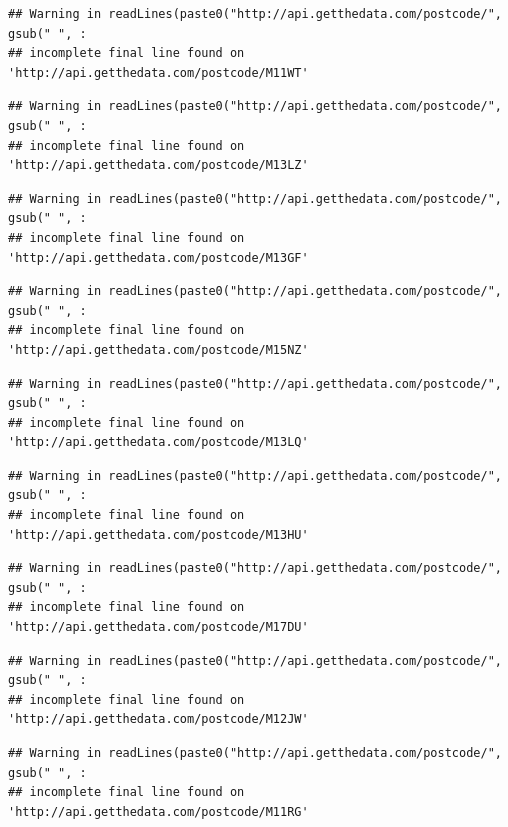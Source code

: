 \documentclass[]{book}
\begin{document}
\begin{verbatim}
## Warning in readLines(paste0("http://api.getthedata.com/postcode/", gsub(" ", :
## incomplete final line found on 'http://api.getthedata.com/postcode/M11WT'
\end{verbatim}

\begin{verbatim}
## Warning in readLines(paste0("http://api.getthedata.com/postcode/", gsub(" ", :
## incomplete final line found on 'http://api.getthedata.com/postcode/M13LZ'
\end{verbatim}

\begin{verbatim}
## Warning in readLines(paste0("http://api.getthedata.com/postcode/", gsub(" ", :
## incomplete final line found on 'http://api.getthedata.com/postcode/M13GF'
\end{verbatim}

\begin{verbatim}
## Warning in readLines(paste0("http://api.getthedata.com/postcode/", gsub(" ", :
## incomplete final line found on 'http://api.getthedata.com/postcode/M15NZ'
\end{verbatim}

\begin{verbatim}
## Warning in readLines(paste0("http://api.getthedata.com/postcode/", gsub(" ", :
## incomplete final line found on 'http://api.getthedata.com/postcode/M13LQ'
\end{verbatim}

\begin{verbatim}
## Warning in readLines(paste0("http://api.getthedata.com/postcode/", gsub(" ", :
## incomplete final line found on 'http://api.getthedata.com/postcode/M13HU'
\end{verbatim}

\begin{verbatim}
## Warning in readLines(paste0("http://api.getthedata.com/postcode/", gsub(" ", :
## incomplete final line found on 'http://api.getthedata.com/postcode/M17DU'
\end{verbatim}

\begin{verbatim}
## Warning in readLines(paste0("http://api.getthedata.com/postcode/", gsub(" ", :
## incomplete final line found on 'http://api.getthedata.com/postcode/M12JW'
\end{verbatim}

\begin{verbatim}
## Warning in readLines(paste0("http://api.getthedata.com/postcode/", gsub(" ", :
## incomplete final line found on 'http://api.getthedata.com/postcode/M11RG'
\end{verbatim}
\end{document}
